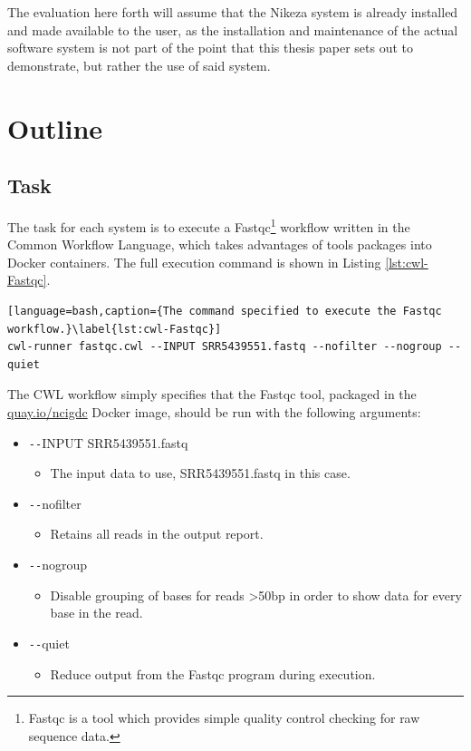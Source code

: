 The evaluation here forth will assume that the Nikeza system is already installed and made available to the user, as the installation and maintenance of the actual software system is not part of the point that this thesis paper sets out to demonstrate, but rather the use of said system.

\section{Outline}

\subsection{Task}

The task for each system is to execute a Fastqc\footnote{Fastqc is a tool which provides simple quality control checking for raw sequence data.} workflow written in the Common Workflow Language, which takes advantages of tools packages into Docker containers. The full execution command is shown in Listing \ref{lst:cwl-Fastqc}.

\begin{lstlisting}[language=bash,caption={The command specified to execute the Fastqc workflow.}\label{lst:cwl-Fastqc}]
cwl-runner fastqc.cwl --INPUT SRR5439551.fastq --nofilter --nogroup --quiet
\end{lstlisting}

The CWL workflow simply specifies that the Fastqc tool, packaged in the \url{quay.io/ncigdc} Docker image, should be run with the following arguments:

\begin{itemize}
    \item \texttt{-{}-}INPUT SRR5439551.fastq
    \begin{itemize}
        \item The input data to use, SRR5439551.fastq in this case.
    \end{itemize}
    \item \texttt{-{}-}nofilter
    \begin{itemize}
        \item Retains all reads in the output report.
    \end{itemize}
    \item \texttt{-{}-}nogroup 
    \begin{itemize}
        \item Disable grouping of bases for reads >50bp in order to show data for every base in the read.
    \end{itemize}
    \item \texttt{-{}-}quiet 
    \begin{itemize}
        \item Reduce output from the Fastqc program during execution.
    \end{itemize}
\end{itemize}

